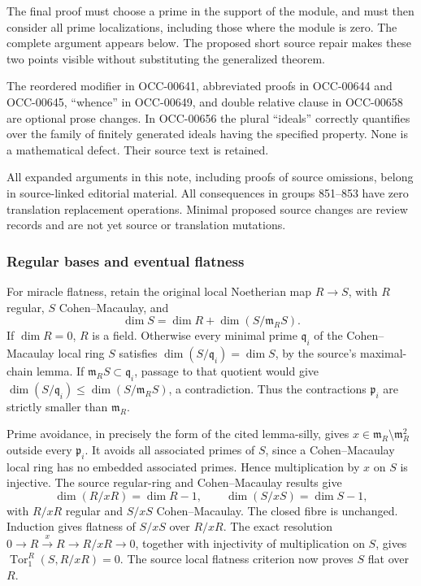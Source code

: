 The final proof must choose a prime in the support of the module, and must then consider all prime localizations, including those where the module is zero. The complete argument appears below. The proposed short source repair makes these two points visible without substituting the generalized theorem.

The reordered modifier in OCC-00641, abbreviated proofs in OCC-00644 and OCC-00645, ``whence'' in OCC-00649, and double relative clause in OCC-00658 are optional prose changes. In OCC-00656 the plural ``ideals'' correctly quantifies over the family of finitely generated ideals having the specified property. None is a mathematical defect. Their source text is retained.

All expanded arguments in this note, including proofs of source omissions, belong in source-linked editorial material. All consequences in groups 851--853 have zero translation replacement operations. Minimal proposed source changes are review records and are not yet source or translation mutations.

\subsubsection{Regular bases and eventual flatness}\label{algebra-proof-038-regular-bases-and-eventual-flatness}

For miracle flatness, retain the original local Noetherian map \(R\to S\), with \(R\) regular, \(S\) Cohen--Macaulay, and \[
\dim S=\dim R+\dim(S/\mathfrak m_RS).
\] If \(\dim R=0\), \(R\) is a field. Otherwise every minimal prime \(\mathfrak q_i\) of the Cohen--Macaulay local ring \(S\) satisfies \(\dim(S/\mathfrak q_i)=\dim S\), by the source's maximal-chain lemma. If \(\mathfrak m_RS\subset\mathfrak q_i\), passage to that quotient would give \(\dim(S/\mathfrak q_i)\leq\dim(S/\mathfrak m_RS)\), a contradiction. Thus the contractions \(\mathfrak p_i\) are strictly smaller than \(\mathfrak m_R\).

Prime avoidance, in precisely the form of the cited lemma-silly, gives \(x\in\mathfrak m_R\setminus\mathfrak m_R^2\) outside every \(\mathfrak p_i\). It avoids all associated primes of \(S\), since a Cohen--Macaulay local ring has no embedded associated primes. Hence multiplication by \(x\) on \(S\) is injective. The source regular-ring and Cohen--Macaulay results give \[
\dim(R/xR)=\dim R-1,\qquad
\dim(S/xS)=\dim S-1,
\] with \(R/xR\) regular and \(S/xS\) Cohen--Macaulay. The closed fibre is unchanged. Induction gives flatness of \(S/xS\) over \(R/xR\). The exact resolution \(0\to R\xrightarrow{x}R\to R/xR\to0\), together with injectivity of multiplication on \(S\), gives \(\operatorname{Tor}_1^R(S,R/xR)=0\). The source local flatness criterion now proves \(S\) flat over \(R\).

